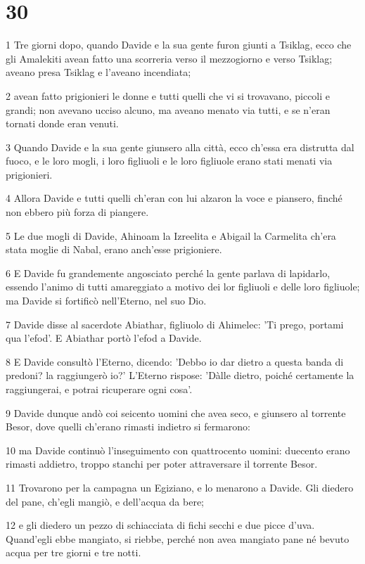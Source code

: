 \chapter{30}

\par 1 Tre giorni dopo, quando Davide e la sua gente furon giunti a Tsiklag, ecco che gli Amalekiti avean fatto una scorreria verso il mezzogiorno e verso Tsiklag; aveano presa Tsiklag e l'aveano incendiata;
\par 2 avean fatto prigionieri le donne e tutti quelli che vi si trovavano, piccoli e grandi; non avevano ucciso alcuno, ma aveano menato via tutti, e se n'eran tornati donde eran venuti.
\par 3 Quando Davide e la sua gente giunsero alla città, ecco ch'essa era distrutta dal fuoco, e le loro mogli, i loro figliuoli e le loro figliuole erano stati menati via prigionieri.
\par 4 Allora Davide e tutti quelli ch'eran con lui alzaron la voce e piansero, finché non ebbero più forza di piangere.
\par 5 Le due mogli di Davide, Ahinoam la Izreelita e Abigail la Carmelita ch'era stata moglie di Nabal, erano anch'esse prigioniere.
\par 6 E Davide fu grandemente angosciato perché la gente parlava di lapidarlo, essendo l'animo di tutti amareggiato a motivo dei lor figliuoli e delle loro figliuole; ma Davide si fortificò nell'Eterno, nel suo Dio.
\par 7 Davide disse al sacerdote Abiathar, figliuolo di Ahimelec: 'Ti prego, portami qua l'efod'. E Abiathar portò l'efod a Davide.
\par 8 E Davide consultò l'Eterno, dicendo: 'Debbo io dar dietro a questa banda di predoni? la raggiungerò io?' L'Eterno rispose: 'Dàlle dietro, poiché certamente la raggiungerai, e potrai ricuperare ogni cosa'.
\par 9 Davide dunque andò coi seicento uomini che avea seco, e giunsero al torrente Besor, dove quelli ch'erano rimasti indietro si fermarono:
\par 10 ma Davide continuò l'inseguimento con quattrocento uomini: duecento erano rimasti addietro, troppo stanchi per poter attraversare il torrente Besor.
\par 11 Trovarono per la campagna un Egiziano, e lo menarono a Davide. Gli diedero del pane, ch'egli mangiò, e dell'acqua da bere;
\par 12 e gli diedero un pezzo di schiacciata di fichi secchi e due picce d'uva. Quand'egli ebbe mangiato, si riebbe, perché non avea mangiato pane né bevuto acqua per tre giorni e tre notti.
